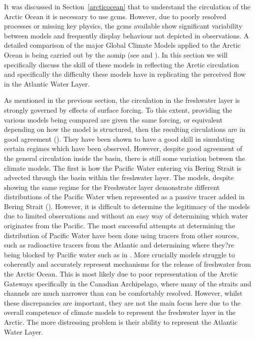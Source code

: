 \documentclass[12pt,a4paper]{report}
\newcommand*\secref[1]{Section~\ref{#1}}
\begin{document}
	It was discussed in \secref{arcticocean} that to understand the circulation of the Arctic
	 Ocean it is necessary to use \glspl{gcm}. However, due to poorly resolved processes or
	  missing key physics, the \glspl{gcm} available show significant variability between
	   models and frequently display behaviour not depicted in observations. 
	A detailed comparison of the major Global Climate Models applied to the Arctic Ocean is
	 being carried out by the \gls{aomip} (see \cite{proshutinsky2008toward} and
	  \cite{proshutinsky2011recent}). In this section we will specifically discuss the skill
	   of these models in reflecting the Arctic circulation and specifically the difficulty
	    these models have in replicating the perceived flow in the Atlantic Water Layer.  

As mentioned in the previous section, the circulation in the freshwater layer is strongly
 governed by effects of surface forcing. To this extent, providing the various models being
  compared are given the same forcing, or equivalent depending on how the model is
   structured, then the resulting circulations are in good agreement
    (\cite{proshutinsky2005arctic}). They have been shown to have a good skill in simulating
     certain regimes which have been observed. However, despite good agreement of the general
      circulation inside the basin, there is still some variation between the climate models.
       The first is how the Pacific Water entering via Bering Strait is advected through the
    basin within the freshwater layer. The models, despite showing the same regime for the
     Freshwater layer demonstrate different distributions of the Pacific Water when
      represented as a passive tracer added in Bering Strait (\cite{proshutinsky2011recent}).
       However, it is difficult to
       determine the legitimacy of the models
       due to limited observations and without an easy way of determining which water originates from the Pacific. The
     most successful attempts at determining the distribution of Pacific Water have been
     done using tracers from other sources, such as radioactive tracers from the Atlantic and
      determining where they?re being blocked by Pacific water such as in \cite{karcher2004dispersion}. More crucially models struggle to coherently and accurately represent
    mechanisms for the release of freshwater from the Arctic Ocean. This is most likely
     due to poor representation of the Arctic Gateways specifically in the Canadian
      Archipelago, where many of the straits and channels are much narrower than can be
   comfortably resolved. However, whilst these discrepancies are important, they are
    not the main focus here due to the overall competence of climate models to
 represent the freshwater layer in the Arctic. The more distressing problem is
  their ability to represent the Atlantic Water Layer. 
\end{document}
